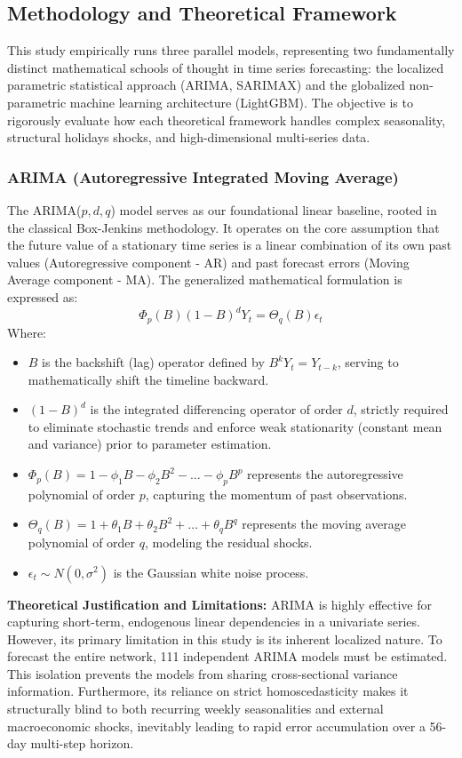\documentclass[conference, 12pt, onecolumn]{IEEEtran}
\begin{document}
\subsection{Methodology and Theoretical Framework}
This study empirically runs three parallel models, representing two fundamentally distinct mathematical schools of thought in time series forecasting: the localized parametric statistical approach (ARIMA, SARIMAX) and the globalized non-parametric machine learning architecture (LightGBM). The objective is to rigorously evaluate how each theoretical framework handles complex seasonality, structural holidays shocks, and high-dimensional multi-series data.

\subsubsection{ARIMA (Autoregressive Integrated Moving Average)}
The ARIMA($p, d, q$) model serves as our foundational linear baseline, rooted in the classical Box-Jenkins methodology. It operates on the core assumption that the future value of a stationary time series is a linear combination of its own past values (Autoregressive component - AR) and past forecast errors (Moving Average component - MA). The generalized mathematical formulation is expressed as:
$$\Phi_p(B)(1 - B)^d Y_t = \Theta_q(B)\epsilon_t$$
Where:
\begin{itemize}
    \item $B$ is the backshift (lag) operator defined by $B^k Y_t = Y_{t-k}$, serving to mathematically shift the timeline backward.
    \item $(1 - B)^d$ is the integrated differencing operator of order $d$, strictly required to eliminate stochastic trends and enforce weak stationarity (constant mean and variance) prior to parameter estimation.
    \item $\Phi_p(B) = 1 - \phi_1 B - \phi_2 B^2 - \dots - \phi_p B^p$ represents the autoregressive polynomial of order $p$, capturing the momentum of past observations.
    \item $\Theta_q(B) = 1 + \theta_1 B + \theta_2 B^2 + \dots + \theta_q B^q$ represents the moving average polynomial of order $q$, modeling the residual shocks.
    \item $\epsilon_t \sim N(0, \sigma^2)$ is the Gaussian white noise process.
\end{itemize}
\textbf{Theoretical Justification and Limitations:} ARIMA is highly effective for capturing short-term, endogenous linear dependencies in a univariate series. However, its primary limitation in this study is its inherent localized nature. To forecast the entire network, 111 independent ARIMA models must be estimated. This isolation prevents the models from sharing cross-sectional variance information. Furthermore, its reliance on strict homoscedasticity makes it structurally blind to both recurring weekly seasonalities and external macroeconomic shocks, inevitably leading to rapid error accumulation over a 56-day multi-step horizon.
\end{document}
